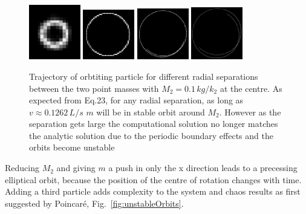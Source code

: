 \documentclass[10pt,a4paper]{article}
\begin{document}
\begin{figure}[h!]
\begin{center}
\includegraphics[width =0.2\textwidth]{traceOrbit0.01.eps}
\includegraphics[width =0.2\textwidth]{traceOrbit0.05.eps}
\includegraphics[width =0.2\textwidth]{traceOrbit0.1.eps}
\includegraphics[width =0.2\textwidth]{traceOrbit0.15.eps}
\caption{Trajectory of orbtiting particle for different radial separations between the two point masses with $M_2=0.1\, kg/k_2$ at the centre. As expected from Eq.23, for any radial separation, as long as $v \approx 0.1262\,L/s$ $m$ will be in stable orbit around $M_2$. However as the separation gets large the computational solution no longer matches the analytic solution due to the periodic boundary effects and the orbits become unstable}
\label{fig:stableOrbits}
\end{center}
\end{figure}

Reducing $M_2$ and giving $m$ a push in only the x direction leads to a precessing elliptical orbit, because the position of the centre of rotation changes with time. Adding a third particle adds complexity to the system and chaos results as first suggested by Poincar\'{e}, Fig.~\ref{fig:unstableOrbits}.
\end{document}
